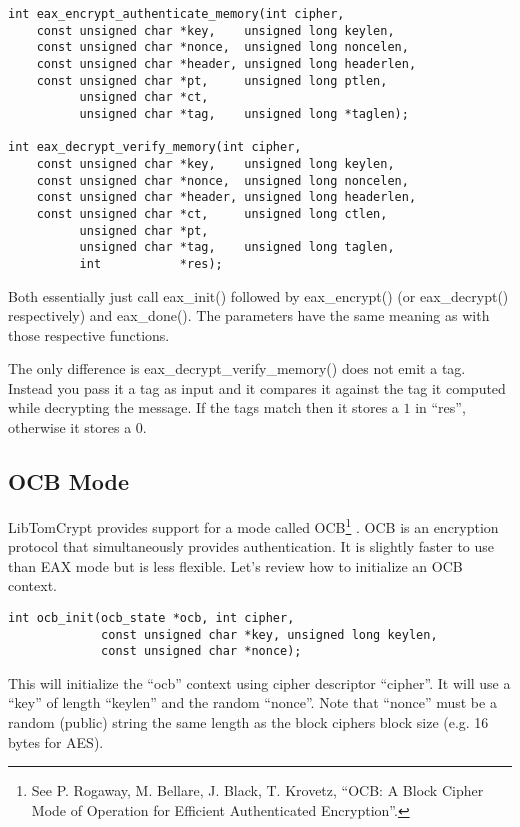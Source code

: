 \documentclass[a4paper]{book}
\begin{document}
 
\begin{verbatim}
int eax_encrypt_authenticate_memory(int cipher,
    const unsigned char *key,    unsigned long keylen,
    const unsigned char *nonce,  unsigned long noncelen,
    const unsigned char *header, unsigned long headerlen,
    const unsigned char *pt,     unsigned long ptlen,
          unsigned char *ct,
          unsigned char *tag,    unsigned long *taglen);

int eax_decrypt_verify_memory(int cipher,
    const unsigned char *key,    unsigned long keylen,
    const unsigned char *nonce,  unsigned long noncelen,
    const unsigned char *header, unsigned long headerlen,
    const unsigned char *ct,     unsigned long ctlen,
          unsigned char *pt,
          unsigned char *tag,    unsigned long taglen,
          int           *res);
\end{verbatim}

Both essentially just call eax\_init() followed by eax\_encrypt() (or eax\_decrypt() respectively) and eax\_done().  The parameters
have the same meaning as with those respective functions.  

The only difference is eax\_decrypt\_verify\_memory() does not emit a tag.  Instead you pass it a tag as input and it compares it against
the tag it computed while decrypting the message.  If the tags match then it stores a $1$ in ``res'', otherwise it stores a $0$.

\subsection{OCB Mode}
LibTomCrypt provides support for a mode called OCB\footnote{See 
P. Rogaway, M. Bellare, J. Black, T. Krovetz, ``OCB: A Block Cipher Mode of Operation for Efficient Authenticated Encryption''.}
.  OCB is an encryption protocol that simultaneously provides authentication.  It is slightly faster to use than EAX mode
but is less flexible.  Let's review how to initialize an OCB context.

\begin{verbatim}
int ocb_init(ocb_state *ocb, int cipher, 
             const unsigned char *key, unsigned long keylen, 
             const unsigned char *nonce);
\end{verbatim}

This will initialize the ``ocb'' context using cipher descriptor ``cipher''.  It will use a ``key'' of length ``keylen''
and the random ``nonce''.  Note that ``nonce'' must be a random (public) string the same length as the block ciphers
block size (e.g. 16 bytes for AES).
\end{document}
